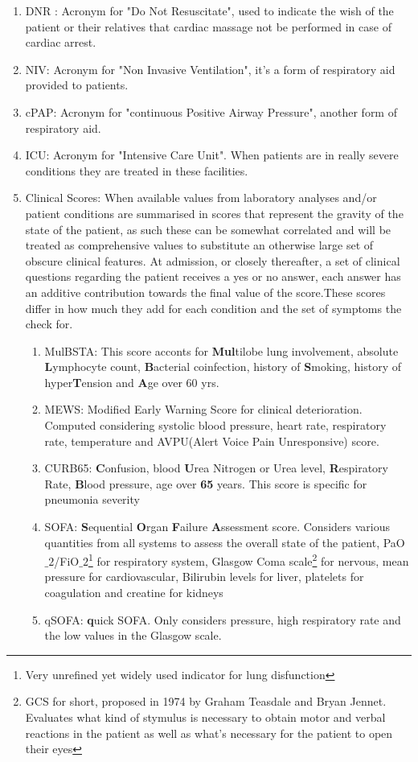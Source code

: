 \begin{enumerate}\label{clinical_features}
\item DNR : Acronym for "Do Not Resuscitate", used to indicate the wish of the patient or their relatives that cardiac massage not be performed in case of cardiac arrest.
\item NIV: Acronym for "Non Invasive Ventilation", it's a form of respiratory aid provided to patients.
\item cPAP: Acronym for  "continuous Positive Airway Pressure", another form of respiratory aid.
\item ICU: Acronym for "Intensive Care Unit". When patients are in really severe conditions they are treated in these facilities.
\item Clinical Scores: When available values from laboratory analyses and/or patient conditions are summarised in scores that represent the gravity of the state of the patient, as such these can be somewhat correlated and will be treated as comprehensive values to substitute an otherwise large set of obscure clinical features. At admission, or closely thereafter, a set of clinical questions regarding the patient receives a yes or no answer, each answer has an additive contribution towards the final value of the score.These scores differ in how much they add for each condition and the set of symptoms the check for.
	\begin{enumerate}
		\item MulBSTA: This score acconts for \textbf{Mul}tilobe lung involvement, absolute \textbf{L}ymphocyte count, \textbf{B}acterial coinfection, history of \textbf{S}moking, history of hyper\textbf{T}ension and \textbf{A}ge over 60 yrs. \cite{MulBSTA}
		\item MEWS: Modified Early Warning Score for clinical deterioration. Computed considering systolic blood pressure, heart rate, respiratory rate, temperature and AVPU(Alert Voice Pain Unresponsive) score. \cite{MEWS}
		\item CURB65: \textbf{C}onfusion, blood \textbf{U}rea Nitrogen or Urea level, \textbf{R}espiratory Rate, \textbf{B}lood pressure, age over \textbf{65} years. This score is specific for pneumonia severity \cite{CURB65}
		\item SOFA:  \textbf{S}equential  \textbf{O}rgan  \textbf{F}ailure  \textbf{A}ssessment score. Considers various quantities from all systems to assess the overall state of the patient, PaO$\_2$/FiO$\_2$\footnote{Very unrefined yet widely used indicator for lung disfunction} for respiratory system, Glasgow Coma scale\footnote{GCS for short, proposed in 1974 by Graham Teasdale and Bryan Jennet. Evaluates what kind of stymulus is necessary to obtain motor and verbal reactions in the patient as well as what's necessary for the patient to open their eyes} for nervous, mean pressure for cardiovascular, Bilirubin levels for liver, platelets for coagulation and creatine for kidneys \cite{SOFA}
		\item qSOFA:  \textbf{q}uick SOFA. Only considers pressure, high respiratory rate and the low values in the Glasgow scale.
	\end{enumerate}
\end{enumerate}

